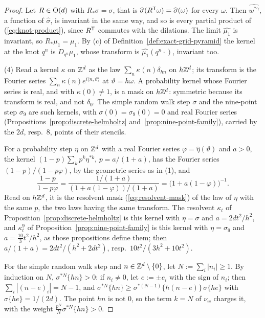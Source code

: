 \begin{proof}
Let $R \in \mathrm{O}(d)$ with $R_*\sigma = \sigma$, that is $\widehat{\sigma}(R^{\mathsf{T}}\omega) =
\widehat{\sigma}(\omega)$ for every $\omega$. Then $\widehat{w^{*\gamma}}$, a function of
$\widehat{\sigma}$, is invariant in the same way, and so is every partial product of
(\ref{eq:knot-product}), since $R^{\mathsf{T}}$ commutes with the dilations. The limit
$\widehat{\mu_1}$ is invariant, so $R_*\mu_1 = \mu_1$. By (c) of
Definition~\ref{def:exact-grid-pyramid} the kernel at the knot $q^n$ is $D_{q^n}\mu_1$, whose
transform is $\widehat{\mu_1}(q^n\cdot)$, invariant too.

(4) Read a kernel $\kappa$ on $\mathbb{Z}^d$ as the law $\sum_n\kappa(n)\delta_{hn}$ on $h\mathbb{Z}^d$; its
transform is the Fourier series $\sum_n\kappa(n)e^{i\langle n, \vartheta\rangle}$ at
$\vartheta = h\omega$. A probability kernel whose Fourier series is real, and with
$\kappa(0) \ne 1$, is a mask on $h\mathbb{Z}^d$: symmetric because its transform is real, and not
$\delta_0$. The simple random walk step $\sigma$ and the nine-point step $\sigma_9$ are such
kernels, with $\sigma(0) = \sigma_9(0) = 0$ and real Fourier series
(Propositions~\ref{prop:discrete-helmholtz} and~\ref{prop:nine-point-family}), carried by the
$2d$, resp.\ $8$, points of their stencils.

For a probability step $\eta$ on $\mathbb{Z}^d$ with a real Fourier series
$\varphi = \widehat{\eta}(\vartheta)$ and $a > 0$, the kernel $(1 - p)\sum_kp^k\eta^{*k}$,
$p = a/(1+a)$, has the Fourier series $(1-p)/(1 - p\varphi)$, by the geometric series as in (1),
and
\[
\frac{1 - p}{1 - p\varphi} = \frac{1/(1+a)}{(1 + a(1-\varphi))/(1+a)} = \bigl(1 + a(1 - \varphi)\bigr)^{-1} .
\]
Read on $h\mathbb{Z}^d$, it is the resolvent mask (\ref{eq:resolvent-mask}) of the law of $\eta$ with the
same $p$, the two laws having the same transform. The resolvent $\kappa_t$ of
Proposition~\ref{prop:discrete-helmholtz} is this kernel with
$\eta = \sigma$ and $a = 2dt^2/h^2$, and $\kappa^9_t$ of Proposition~\ref{prop:nine-point-family}
is this kernel with $\eta = \sigma_9$ and $a = \tfrac{10}{3}t^2/h^2$, as those propositions define
them; then $a/(1+a) = 2dt^2/(h^2 + 2dt^2)$, resp.\ $10t^2/(3h^2 + 10t^2)$.

For the simple random walk step and $n \in \mathbb{Z}^d \setminus \{0\}$, let $N := \sum_i|n_i| \ge 1$.
By induction on $N$, $\sigma^{*N}\{hn\} > 0$: if $n_i \ne 0$, let $e := \pm e_i$ with the sign of
$n_i$; then $\sum_i|(n - e)_i| = N - 1$, and $\sigma^{*N}\{hn\} \ge \sigma^{*(N-1)}\{h(n - e)\}\,
\sigma\{he\}$ with $\sigma\{he\} = 1/(2d)$. The point $hn$ is not $0$, so the term $k = N$ of
$\nu_w$ charges it, with the weight $\tfrac{p^N}{N}\sigma^{*N}\{hn\} > 0$.


\end{proof}
